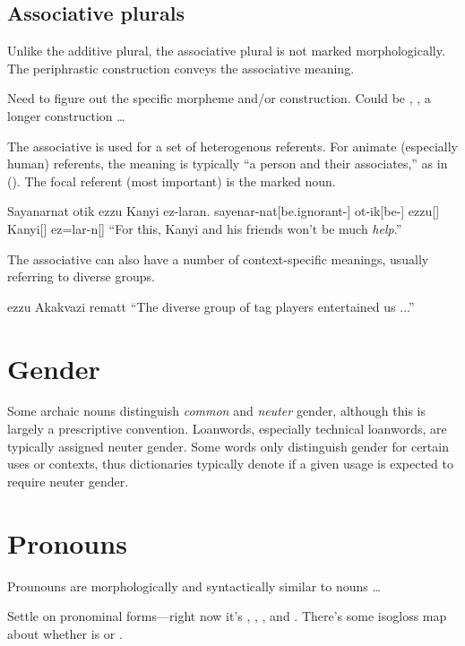 \subsection{Associative plurals}
Unlike the additive plural, the associative plural is not marked morphologically. The periphrastic construction  conveys the associative meaning. 

\begin{kaobox}
Need to figure out the specific morpheme and/or construction. Could be , , a longer construction \dots
\end{kaobox}

The associative is used for a set of heterogenous referents. For animate (especially human) referents, the meaning is typically “a person and their associates,” as in (\nextx). The focal referent (\ie most important) is the marked noun.

\ex \begingl
\glpreamble Sayanarnat otik ezzu Kanyi ez-laran. \endpreamble
sayenar-nat[be.ignorant-]
ot-ik[be-]
ezzu[]
Kanyi[]
ez=lar-n[]
\glft “For this, Kanyi and his friends won't be much \emph{help}.”
\endgl \xe

The associative can also have a number of context-specific meanings, usually referring to diverse groups.

\pex 
\a \begingl
\glpreamble ezzu Akakvazi rematt \endpreamble
\glft “The diverse group of tag players entertained us ...”
\endgl 
\xe

\section{Gender}
Some archaic nouns distinguish \emph{common} and \emph{neuter} gender, although this is largely a prescriptive convention.  Loanwords, especially technical loanwords, are typically assigned neuter gender. Some words only distinguish gender for certain uses or contexts, thus dictionaries typically denote if a given usage is expected to require neuter gender.

\section{Pronouns}
Prounouns are morphologically and syntactically similar to nouns \dots

\begin{kaobox}[frametitle=\sc todo:]
Settle on pronominal forms---right now it's  ,  ,  , and  . There's some isogloss map about whether  is  or .
\end{kaobox}